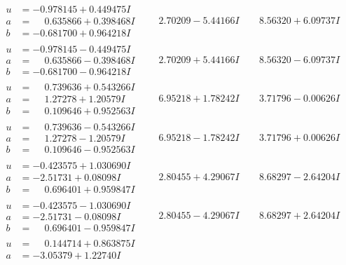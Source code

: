 \documentclass[1p]{elsarticle_modified}
\theoremstyle{definition}
\begin{document}
$$\begin{array}{c|c|c}
\begin{aligned}
u &= -0.978145 + 0.449475 I \\
a &= \phantom{-}0.635866 + 0.398468 I \\
b &= -0.681700 + 0.964218 I\end{aligned}
 & \phantom{-}2.70209 - 5.44166 I & \phantom{-}8.56320 + 6.09737 I \\ \hline\begin{aligned}
u &= -0.978145 - 0.449475 I \\
a &= \phantom{-}0.635866 - 0.398468 I \\
b &= -0.681700 - 0.964218 I\end{aligned}
 & \phantom{-}2.70209 + 5.44166 I & \phantom{-}8.56320 - 6.09737 I \\ \hline\begin{aligned}
u &= \phantom{-}0.739636 + 0.543266 I \\
a &= \phantom{-}1.27278 + 1.20579 I \\
b &= \phantom{-}0.109646 + 0.952563 I\end{aligned}
 & \phantom{-}6.95218 + 1.78242 I & \phantom{-}3.71796 - 0.00626 I \\ \hline\begin{aligned}
u &= \phantom{-}0.739636 - 0.543266 I \\
a &= \phantom{-}1.27278 - 1.20579 I \\
b &= \phantom{-}0.109646 - 0.952563 I\end{aligned}
 & \phantom{-}6.95218 - 1.78242 I & \phantom{-}3.71796 + 0.00626 I \\ \hline\begin{aligned}
u &= -0.423575 + 1.030690 I \\
a &= -2.51731 + 0.08098 I \\
b &= \phantom{-}0.696401 + 0.959847 I\end{aligned}
 & \phantom{-}2.80455 + 4.29067 I & \phantom{-}8.68297 - 2.64204 I \\ \hline\begin{aligned}
u &= -0.423575 - 1.030690 I \\
a &= -2.51731 - 0.08098 I \\
b &= \phantom{-}0.696401 - 0.959847 I\end{aligned}
 & \phantom{-}2.80455 - 4.29067 I & \phantom{-}8.68297 + 2.64204 I \\ \hline\begin{aligned}
u &= \phantom{-}0.144714 + 0.863875 I \\
a &= -3.05379 + 1.22740 I \\

\end{aligned}
\end{array}$$
\end{document}
